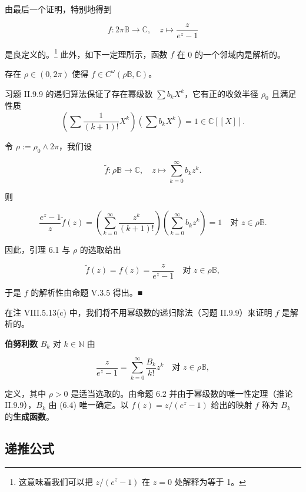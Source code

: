 由最后一个证明，特别地得到

\[
f : 2\pi\mathbb{B} \to \mathbb{C} , \quad z \mapsto \frac{z}{e^z - 1}
\]

是良定义的。\footnote{这意味着我们可以把 $ z/(e^z - 1) $ 在 $ z = 0 $ 处解释为等于 1。} 此外，如下一定理所示，函数 $ f $ 在 0 的一个邻域内是解析的。

\begin{proposition}

存在 $ \rho \in (0, 2\pi) $ 使得 $ f \in C^{\omega}(\rho\mathbb{B}, \mathbb{C}) $。

\proofhead
习题 II.9.9 的递归算法保证了存在幂级数 $ \sum b_k X^k $，它有正的收敛半径 $ \rho_0 $ 且满足性质
\[
\left( \sum \frac{1}{(k+1)!}X^k \right)\left( \sum b_k X^k \right) = 1 \in \mathbb{C}[[X]] .
\]

令 $ \rho := \rho_0 \wedge 2\pi $，我们设

\[
\tilde{f} : \rho\mathbb{B} \to \mathbb{C} , \quad z \mapsto \sum_{k=0}^{\infty} b_k z^k .
\]

则

\[
\frac{e^z - 1}{z}\tilde{f}(z) = \left( \sum_{k=0}^{\infty} \frac{z^k}{(k+1)!} \right)\left( \sum_{k=0}^{\infty} b_k z^k \right) = 1 \quad \text{对 } z \in \rho\mathbb{B} .
\]

因此，引理 6.1 与 $ \rho $ 的选取给出

\[
\tilde{f}(z) = f(z) = \frac{z}{e^z - 1} \quad \text{对 } z \in \rho\mathbb{B} ,
\]

于是 $ f $ 的解析性由命题 V.3.5 得出。\nobreak\hspace{0.35em}■

\end{proposition}

在注 VIII.5.13(c) 中，我们将不用幂级数的递归除法（习题 II.9.9）来证明 $ f $ 是解析的。

\textbf{伯努利数} $ B_k $ 对 $ k \in \mathbb{N} $ 由

\begin{equation}
\frac{z}{e^z - 1} = \sum_{k=0}^{\infty}\frac{B_k}{k!}z^k \quad \text{对 } z \in \rho\mathbb{B} ,\tag{6.4}
\end{equation}

定义，其中 $ \rho > 0 $ 是适当选取的。由命题 6.2 并由于幂级数的唯一性定理（推论 II.9.9），$ B_k $ 由 (6.4) 唯一确定。以 $ f(z) = z/(e^z - 1) $ 给出的映射 $ f $ 称为 $ B_k $ 的\textbf{生成函数}。

\subsection*{递推公式}


